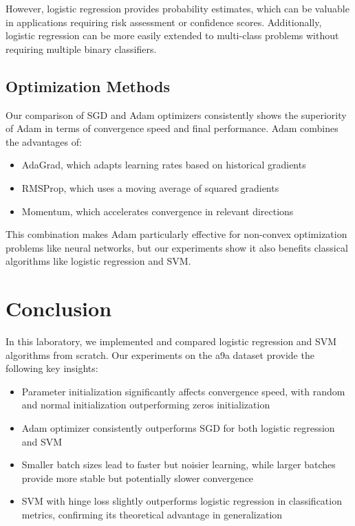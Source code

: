 \documentclass[journal, a4paper]{IEEEtran}
\begin{document}
However, logistic regression provides probability estimates, which can be valuable in applications requiring risk assessment or confidence scores. Additionally, logistic regression can be more easily extended to multi-class problems without requiring multiple binary classifiers.

\subsection{Optimization Methods}
Our comparison of SGD and Adam optimizers consistently shows the superiority of Adam in terms of convergence speed and final performance. Adam combines the advantages of:

\begin{itemize}
    \item AdaGrad, which adapts learning rates based on historical gradients
    \item RMSProp, which uses a moving average of squared gradients
    \item Momentum, which accelerates convergence in relevant directions
\end{itemize}

This combination makes Adam particularly effective for non-convex optimization problems like neural networks, but our experiments show it also benefits classical algorithms like logistic regression and SVM.

\section{Conclusion}
In this laboratory, we implemented and compared logistic regression and SVM algorithms from scratch. Our experiments on the a9a dataset provide the following key insights:

\begin{itemize}
    \item Parameter initialization significantly affects convergence speed, with random and normal initialization outperforming zeros initialization
    \item Adam optimizer consistently outperforms SGD for both logistic regression and SVM
    \item Smaller batch sizes lead to faster but noisier learning, while larger batches provide more stable but potentially slower convergence
    \item SVM with hinge loss slightly outperforms logistic regression in classification metrics, confirming its theoretical advantage in generalization
\end{itemize}
\end{document}

